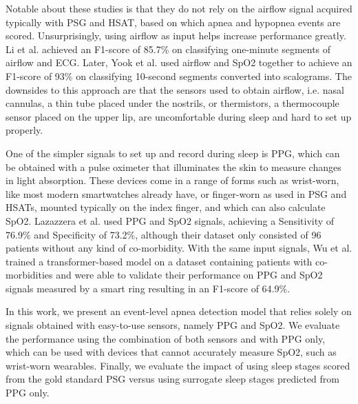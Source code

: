 Notable about these studies is that they do not rely on the airflow signal acquired typically with PSG and HSAT, based on which apnea and hypopnea events are scored. Unsurprisingly, using airflow as input helps increase performance greatly. Li et al. \cite{li2023deep} achieved an F1-score of 85.7\% on classifying one-minute segments of airflow and ECG. Later, Yook et al. \cite{yook2024deep} used airflow and SpO2 together to achieve an F1-score of 93\% on classifying 10-second segments converted into scalograms.
The downsides to this approach are that the sensors used to obtain airflow, i.e. nasal cannulas, a thin tube placed under the nostrils, or thermistors, a thermocouple sensor placed on the upper lip, are uncomfortable during sleep and hard to set up properly.

One of the simpler signals to set up and record during sleep is PPG, which can be obtained with a pulse oximeter that illuminates the skin to measure changes in light absorption.
These devices come in a range of forms such as wrist-worn, like most modern smartwatches already have, or finger-worn as used in PSG and HSATs, mounted typically on the index finger, and which can also calculate SpO2.
Lazazzera et al. \cite {lazazzera2020detection} used PPG and SpO2 signals, achieving a Sensitivity of 76.9\% and Specificity of 73.2\%, although their dataset only consisted of 96 patients without any kind of co-morbidity. With the same input signals, Wu et al. \cite{wu2024transformer} trained a transformer-based model on a dataset containing patients with co-morbidities and were able to validate their performance on PPG and SpO2 signals measured by a smart ring resulting in an F1-score of 64.9\%.

In this work, we present an event-level apnea detection model that relies solely on signals obtained with easy-to-use sensors, namely PPG and SpO2. We evaluate the performance using the combination of both sensors and with PPG only, which can be used with devices that cannot accurately measure SpO2, such as wrist-worn wearables. Finally, we evaluate the impact of using sleep stages scored from the gold standard PSG versus using surrogate sleep stages predicted from PPG only.
